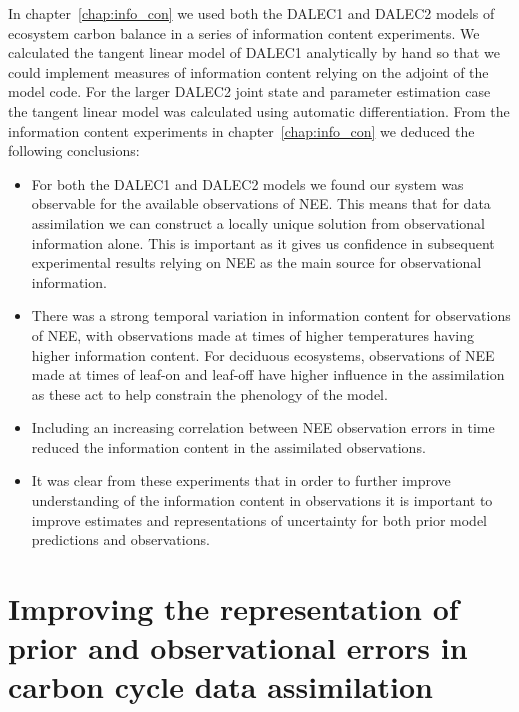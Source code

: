 In chapter~\ref{chap:info_con} we used both the DALEC1 and DALEC2 models of ecosystem carbon balance in a series of information content experiments. We calculated the tangent linear model of DALEC1 analytically by hand so that we could implement measures of information content relying on the adjoint of the model code. For the larger DALEC2 joint state and parameter estimation case the tangent linear model was calculated using automatic differentiation. From the information content experiments in chapter~\ref{chap:info_con} we deduced the following conclusions:
\begin{itemize}
\item For both the DALEC1 and DALEC2 models we found our system was observable for the available observations of NEE. This means that for data assimilation we can construct a locally unique solution from observational information alone. This is important as it gives us confidence in subsequent experimental results relying on NEE as the main source for observational information.
\item There was a strong temporal variation in information content for observations of NEE, with observations made at times of higher temperatures having higher information content. For deciduous ecosystems, observations of NEE made at times of leaf-on and leaf-off have higher influence in the assimilation as these act to help constrain the phenology of the model. 
\item Including an increasing correlation between NEE observation errors in time reduced the information content in the assimilated observations. 
\item It was clear from these experiments that in order to further improve understanding of the information content in observations it is important to improve estimates and representations of uncertainty for both prior model predictions and observations.
\end{itemize}

\section{Improving the representation of prior and observational errors in carbon cycle data assimilation}

